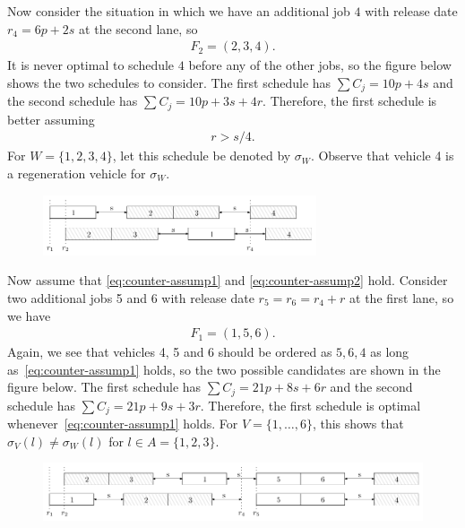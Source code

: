 \documentclass{article}
\theoremstyle{definition}
\theoremstyle{plain}
\begin{document}
Now consider the situation in which we have an additional job $4$ with release
date $r_{4} = 6p + 2s$ at the second lane, so
\begin{align*}
  F_{2} = (2,3,4) .
\end{align*}
It is never optimal to schedule $4$ before any of the other jobs, so the figure
below shows the two schedules to consider. The first schedule has
$\sum C_{j} = 10p + 4s$ and the second schedule has
$\sum C_{j} = 10p + 3s + 4r$. Therefore, the first schedule is better assuming
\begin{align}
  \label{eq:counter-assump2}
  r > s/4 .
\end{align}
For $W = \{1, 2, 3, 4\}$, let this schedule be denoted by $\sigma_{W}$.
Observe that vehicle 4 is a regeneration vehicle for $\sigma_{W}$.

\begin{figure}[h]
  \centering
  \includegraphics[width=0.72\textwidth]{figures/1234.pdf}
\end{figure}

Now assume that \eqref{eq:counter-assump1} and \eqref{eq:counter-assump2} hold.
Consider two additional jobs 5 and 6 with release date
$r_{5} = r_{6} = r_{4} + r$ at the first lane, so we have
\begin{align*}
  F_{1} = (1, 5, 6) .
\end{align*}
Again, we see that vehicles 4, 5 and 6 should be ordered as $5,6,4$ as long
as~\eqref{eq:counter-assump1} holds, so the two possible candidates are shown in
the figure below. The first schedule has $\sum C_{j} = 21p + 8s + 6r$ and the
second schedule has $\sum C_{j} = 21p + 9s + 3r$. Therefore, the first schedule
is optimal whenever~\eqref{eq:counter-assump1} holds. For
$V = \{ 1, \dots, 6\}$, this shows that $\sigma_{V}(l) \neq \sigma_{W}(l)$ for
$l \in A=\{1, 2, 3 \}$.

\begin{figure}[h]
  \centering
  \includegraphics[width=1.0\textwidth]{figures/123456.pdf}
\end{figure}




\end{document}
